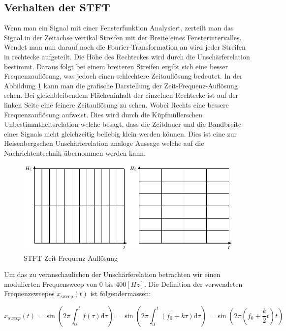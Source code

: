 \subsection{Verhalten der STFT}

Wenn man ein Signal mit einer Fensterfunktion Analysiert, zerteilt man das Signal in der Zeitachse vertikal Streifen mit der Breite eines Fensterintervalles. Wendet man nun darauf noch die Fourier-Transformation an wird jeder Streifen in rechtecke aufgeteilt. Die Höhe des Rechteckes wird durch die Unschärferelation bestimmt. Daraus folgt bei einem breiteren Streifen ergibt sich eine besser Frequenzauflösung, was jedoch einen schlechtere Zeitauflösung bedeutet. In der Abbildung \ref{fig:stftauf} kann man die grafische Darstellung der Zeit-Frequenz-Auflösung sehen. Bei gleichbleibendem Flächeninhalt der einzelnen Rechtecke ist auf der linken Seite eine feinere Zeitauflösung zu sehen. Wobei Rechts eine bessere Frequenzauflösung aufweist. Dies wird durch die Küpfmüllerschen Unbestimmtheitsrelation welche besagt, dass die Zeitdauer und die Bandbreite eines Signals nicht gleichzeitig beliebig klein werden können. Dies ist eine zur Heisenbergschen Unschärferelation analoge Aussage welche auf die Nachrichtentechnik übernommen werden kann.



\begin{figure}[ht]
	\centering
	\includegraphics[width=0.7\linewidth]{papers/autotune/sections/fft/images/windows.pdf}
	\caption{STFT Zeit-Frequenz-Auflösung}\label{fig:stftauf}	
\end{figure}





 
Um das zu veranschaulichen  der Unschärferelation betrachten wir einen modulierten Frequensweep von 0 bis 400$[Hz]$. Die Definition der verwendeten Frequenzsweepes $x_{\text{sweep}}(t)$ ist folgendermassen:

\begin{equation}
x_{sweep}(t)=\sin \left(2 \pi \int_{0}^{t} f(\tau) \mathrm{d} \tau\right)=\sin \left(2 \pi \int_{0}^{t}\left(f_{0}+k \tau\right) \mathrm{d} \tau\right)=\sin \left(2 \pi\left(f_{0}+\frac{k}{2} t\right) t\right)
\end{equation} 

